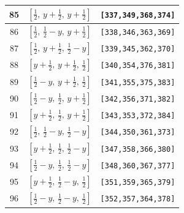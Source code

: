 \documentclass[fleqn,8pt]{jsarticle}
\begin{document}
\begin{longtable}{ccc}
85 & $\left[ \frac{1}{2},\, y + \frac{1}{2},\, y + \frac{1}{2} \right]$ & {\tt [337,349,368,374]} \\ \hline
86 & $\left[ \frac{1}{2},\, \frac{1}{2} - y,\, y + \frac{1}{2} \right]$ & {\tt [338,346,363,369]} \\ \hline
87 & $\left[ \frac{1}{2},\, y + \frac{1}{2},\, \frac{1}{2} - y \right]$ & {\tt [339,345,362,370]} \\ \hline
88 & $\left[ y + \frac{1}{2},\, y + \frac{1}{2},\, \frac{1}{2} \right]$ & {\tt [340,354,376,381]} \\ \hline
89 & $\left[ \frac{1}{2} - y,\, y + \frac{1}{2},\, \frac{1}{2} \right]$ & {\tt [341,355,375,383]} \\ \hline
90 & $\left[ \frac{1}{2} - y,\, \frac{1}{2},\, y + \frac{1}{2} \right]$ & {\tt [342,356,371,382]} \\ \hline
91 & $\left[ y + \frac{1}{2},\, \frac{1}{2},\, y + \frac{1}{2} \right]$ & {\tt [343,353,372,384]} \\ \hline
92 & $\left[ \frac{1}{2},\, \frac{1}{2} - y,\, \frac{1}{2} - y \right]$ & {\tt [344,350,361,373]} \\ \hline
93 & $\left[ y + \frac{1}{2},\, \frac{1}{2},\, \frac{1}{2} - y \right]$ & {\tt [347,358,366,380]} \\ \hline
94 & $\left[ \frac{1}{2} - y,\, \frac{1}{2},\, \frac{1}{2} - y \right]$ & {\tt [348,360,367,377]} \\ \hline
95 & $\left[ y + \frac{1}{2},\, \frac{1}{2} - y,\, \frac{1}{2} \right]$ & {\tt [351,359,365,379]} \\ \hline
96 & $\left[ \frac{1}{2} - y,\, \frac{1}{2} - y,\, \frac{1}{2} \right]$ & {\tt [352,357,364,378]} \\
\end{longtable}
\renewcommand{\arraystretch}{1.2}
\end{document}
